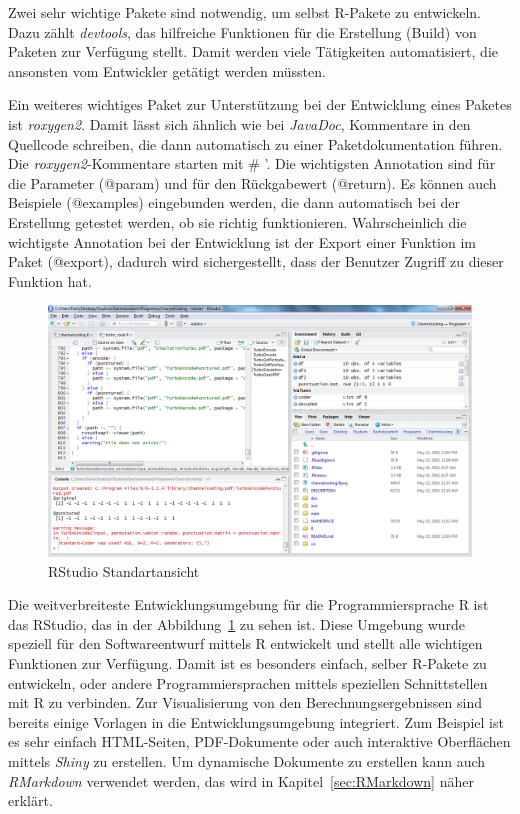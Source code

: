 Zwei sehr wichtige Pakete sind notwendig, um selbst R-Pakete zu entwickeln. Dazu zählt \emph{devtools}, das hilfreiche Funktionen für die Erstellung (Build) von Paketen zur Verfügung stellt. Damit werden viele Tätigkeiten automatisiert, die ansonsten vom Entwickler getätigt werden müssten. \cite{devtools}

Ein weiteres wichtiges Paket zur Unterstützung bei der Entwicklung eines Paketes ist \emph{roxygen2}. Damit lässt sich ähnlich wie bei \emph{JavaDoc}, Kommentare in den Quellcode schreiben, die dann automatisch zu einer Paketdokumentation führen. Die \emph{roxygen2}-Kommentare starten mit \# '. Die wichtigsten Annotation sind für die Parameter (@param) und für den Rückgabewert (@return). Es können auch Beispiele (@examples) eingebunden werden, die dann automatisch bei der Erstellung getestet werden, ob sie richtig funktionieren. Wahrscheinlich die wichtigste Annotation bei der Entwicklung ist der Export einer Funktion im Paket (@export), dadurch wird sichergestellt, dass der Benutzer Zugriff zu dieser Funktion hat. \cite{roxygen}

\begin{figure}[th]
\centering
\includegraphics[width=\ScaleIfNeeded]{pictures/RStudio}
\caption{RStudio Standartansicht}
\label{pic:RStudio}
\end{figure}

Die weitverbreiteste Entwicklungsumgebung für die Programmiersprache R ist das RStudio, das in der Abbildung~\ref{pic:RStudio} zu sehen ist. Diese Umgebung wurde speziell für den Softwareentwurf mittels R entwickelt und stellt alle wichtigen Funktionen zur Verfügung. Damit ist es besonders einfach, selber R-Pakete zu entwickeln, oder andere Programmiersprachen mittels speziellen Schnittstellen mit R zu verbinden. Zur Visualisierung von den Berechnungsergebnissen sind bereits einige Vorlagen in die Entwicklungsumgebung integriert. Zum Beispiel ist es sehr einfach HTML-Seiten, PDF-Dokumente oder auch interaktive Oberflächen mittels \emph{Shiny} zu erstellen. Um dynamische Dokumente zu erstellen kann auch \emph{RMarkdown} verwendet werden, das wird in Kapitel~\ref{sec:RMarkdown} näher erklärt.

